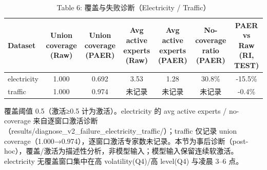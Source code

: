 \begin{table}[htbp]
  \centering
  \caption{Table 6: 覆盖与失败诊断（Electricity / Traffic）}
  \label{tab:coverage}
  \begin{tabular}{lcccccc}
    \toprule
    Dataset & Union coverage (Raw) & Union coverage (PAER) & Avg active experts (Raw) & Avg active experts (PAER) & No-coverage ratio (PAER) & PAER vs Raw (RI, TEST) \\
    \midrule
    electricity & 1.000 & 0.692 & 3.53 & 1.28 & 30.8\% & -15.5\% \\
    traffic & 1.000 & 0.974 & 未记录 & 未记录 & 未记录 & -0.4\% \\
    \bottomrule
  \end{tabular}
  {\footnotesize 覆盖阈值 0.5（激活≥0.5 计为激活）。electricity 的 avg active experts / no-coverage 来自逐窗口激活诊断（results/diagnose\_v2\_failure\_electricity\_traffic/）；traffic 仅记录 union coverage（1.000→0.974），逐窗口激活专家数未记录。本节为事后诊断（post-hoc），覆盖/激活为描述性分析，非模型输入；模型输入保留连续软激活。electricity 无覆盖窗口集中在高 volatility(Q4)/高 level(Q4) 与凌晨 3–6 点。}
\end{table}
